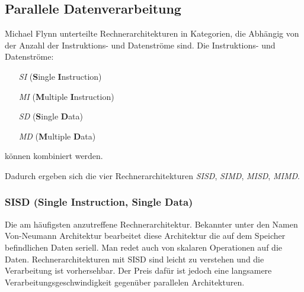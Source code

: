 \subsection{Parallele Datenverarbeitung}
\label{subsec:flynn}
Michael Flynn unterteilte Rechnerarchitekturen in Kategorien, die Abhängig von der Anzahl der Instruktions- und Datenströme sind. \newline
Die Instruktions- und Datenströme:
\begin{enumerate}
\item[\textit{SI}] (\textbf{S}ingle \textbf{I}nstruction)
\item[\textit{MI}] (\textbf{M}ultiple \textbf{I}nstruction) 
\item[\textit{SD}] (\textbf{S}ingle \textbf{D}ata) 
\item[\textit{MD}] (\textbf{M}ultiple \textbf{D}ata) 
\end{enumerate}
können kombiniert werden. \newline

Dadurch ergeben sich die vier Rechnerarchitekturen \textit{SISD}, \textit{SIMD}, \textit{MISD}, \textit{MIMD}.
\subsubsection*{SISD (Single Instruction, Single Data)}
Die am häufigsten anzutreffene Rechnerarchitektur.
Bekannter unter den Namen Von-Neumann Architektur bearbeitet diese Architektur die auf dem Speicher befindlichen Daten seriell.
Man redet auch von skalaren Operationen auf die Daten.
Rechnerarchitekturen mit SISD sind leicht zu verstehen und die Verarbeitung ist vorhersehbar.
Der Preis dafür ist jedoch eine langsamere Verarbeitungsgeschwindigkeit gegenüber parallelen Architekturen.
